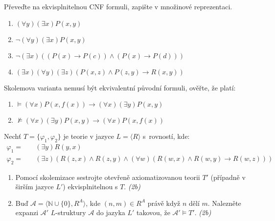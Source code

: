 \documentclass[a4paper,12pt]{article}
\begin{document}
\medskip\begin{problem} Převeďte na ekvisplnitelnou CNF formuli, zapište v množinové reprezentaci.
    \vspace{-6pt}
{\setlength{\columnsep}{-1cm}
\begin{multicols}{2}
\begin{enumerate}
    \item $(\forall y)(\exists x)P(x,y)$
    \item $\neg (\forall y)(\exists x)P(x,y)$
    \item $\neg (\exists x)((P(x)\to P(c))\wedge (P(x)\to P(d)))$
    \item $(\exists x)(\forall y)(\exists z)(P(x,z)\wedge P(z,y) \to R(x,y))$
\end{enumerate}
\end{multicols}
}
\end{problem}

    
\medskip\begin{problem} Skolemova varianta nemusí být ekvivalentní původní formuli, ověřte, že platí:
\begin{enumerate}
    \item $\models (\forall x)P(x,f(x)) \to (\forall x)(\exists y)P(x,y)$
    \item $\not\models (\forall x)(\exists y)P(x,y)\to (\forall x)P(x,f(x))$
\end{enumerate}

\end{problem}


\medskip\begin{problem}
Nechť $T=\{\varphi_1,\varphi_2\}$ je teorie v jazyce $L=\langle R\rangle$ s~rovností, kde:
\begin{align*}
\varphi_1=&\quad (\exists y)R(y,x)\\
\varphi_2=&\quad (\exists z)(R(z,x)\wedge R(z,y)\wedge (\forall w)(R(w,x) \wedge R(w,y)\to R(w,z)))
\end{align*}
\begin{enumerate}
\item Pomocí skolemizace sestrojte otevřeně axiomatizovanou teorii $T'$ (případně v širším jazyce $L'$) ekvisplnitelnou s $T$. {\it (2b)} 
\item Buď $\mathcal{A}=\langle\mathbb{N}\cup\{0\},R^A\rangle$, kde $(n,m)\in R^A$ právě když $n$ dělí $m$.  Nalezněte expanzi $\mathcal{A}'$ $L$-struktury $\mathcal{A}$ do jazyka $L'$ takovou, že $\mathcal{A}'\models T'$. {\it (2b)}
\end{enumerate}
\end{problem}
\end{document}
